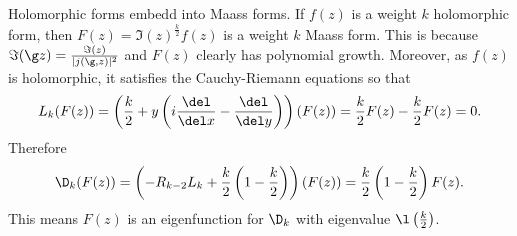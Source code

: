     \begin{remark}\label{rem:holomorphic_embedds_into_Maass}
      Holomorphic forms embedd into Maass forms. If $f(z)$ is a weight $k$ holomorphic form, then $F(z) = \Im(z)^{\frac{k}{2}}f(z)$ is a weight $k$ Maass form. This is because $\Im(\g z) = \frac{\Im(z)}{|j(\g,z)|^{2}}$ and $F(z)$ clearly has polynomial growth. Moreover, as $f(z)$ is holomorphic, it satisfies the Cauchy-Riemann equations so that
      \[
        L_{k}(F(z)) = \left(\frac{k}{2}+y\left(i\frac{\del}{\del x}-\frac{\del}{\del y}\right)\right)(F(z)) = \frac{k}{2}F(z)-\frac{k}{2}F(z) = 0.
      \]
      Therefore
      \[
        \D_{k}(F(z)) = \left(-R_{k-2}L_{k}+\frac{k}{2}\left(1-\frac{k}{2}\right)\right)(F(z)) = \frac{k}{2}\left(1-\frac{k}{2}\right)F(z).
      \]
      This means $F(z)$ is an eigenfunction for $\D_{k}$ with eigenvalue $\l\left(\frac{k}{2}\right)$.
    \end{remark}
  
